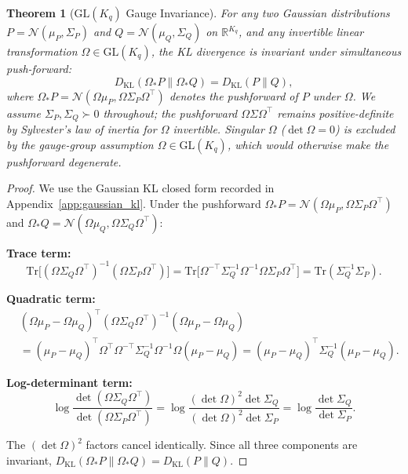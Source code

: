 \documentclass[11pt]{article}
\newtheorem{theorem}{Theorem}
\begin{document}
\begin{theorem}[$\mathrm{GL}(K_q)$ Gauge Invariance]
\label{thm:glk_invariance}
For any two Gaussian distributions $P = \mathcal{N}(\mu_P, \Sigma_P)$ and $Q = \mathcal{N}(\mu_Q, \Sigma_Q)$ on $\mathbb{R}^{K_q}$, and any invertible linear transformation $\Omega \in \mathrm{GL}(K_q)$, the KL divergence is invariant under simultaneous push-forward:
\begin{equation}
D_{\mathrm{KL}}(\Omega_* P \| \Omega_* Q) = D_{\mathrm{KL}}(P \| Q),
\label{eq:glk_invariance}
\end{equation}
where $\Omega_* P = \mathcal{N}(\Omega\mu_P, \Omega\Sigma_P\Omega^\top)$ denotes the pushforward of $P$ under $\Omega$. We assume $\Sigma_P, \Sigma_Q \succ 0$ throughout; the pushforward $\Omega\Sigma\Omega^\top$ remains positive-definite by Sylvester's law of inertia for $\Omega$ invertible. Singular $\Omega$ ($\det\Omega = 0$) is excluded by the gauge-group assumption $\Omega \in \mathrm{GL}(K_q)$, which would otherwise make the pushforward degenerate.
\end{theorem}

\begin{proof}
We use the Gaussian KL closed form recorded in Appendix~\ref{app:gaussian_kl}. Under the pushforward $\Omega_* P = \mathcal{N}(\Omega\mu_P, \Omega\Sigma_P\Omega^\top)$ and $\Omega_* Q = \mathcal{N}(\Omega\mu_Q, \Omega\Sigma_Q\Omega^\top)$:

\textbf{Trace term:}
\begin{equation}
\mathrm{Tr}\big[(\Omega\Sigma_Q\Omega^\top)^{-1}(\Omega\Sigma_P\Omega^\top)\big] = \mathrm{Tr}\big[\Omega^{-\top}\Sigma_Q^{-1}\Omega^{-1}\Omega\Sigma_P\Omega^\top\big] = \mathrm{Tr}(\Sigma_Q^{-1}\Sigma_P).
\end{equation}

\textbf{Quadratic term:}
\begin{align}
&(\Omega\mu_P - \Omega\mu_Q)^\top (\Omega\Sigma_Q\Omega^\top)^{-1} (\Omega\mu_P - \Omega\mu_Q) \nonumber\\
&= (\mu_P - \mu_Q)^\top \Omega^\top \Omega^{-\top}\Sigma_Q^{-1}\Omega^{-1}\Omega (\mu_P - \mu_Q) = (\mu_P - \mu_Q)^\top \Sigma_Q^{-1}(\mu_P - \mu_Q).
\end{align}

\textbf{Log-determinant term:}
\begin{equation}
\log\frac{\det(\Omega\Sigma_Q\Omega^\top)}{\det(\Omega\Sigma_P\Omega^\top)} = \log\frac{(\det\Omega)^2 \det\Sigma_Q}{(\det\Omega)^2 \det\Sigma_P} = \log\frac{\det\Sigma_Q}{\det\Sigma_P}.
\end{equation}

The $(\det\Omega)^2$ factors cancel identically. Since all three components are invariant, $D_{\mathrm{KL}}(\Omega_* P \| \Omega_* Q) = D_{\mathrm{KL}}(P \| Q)$.
\end{proof}
\end{document}
